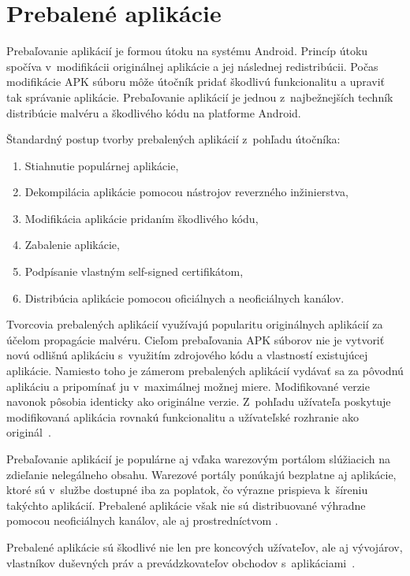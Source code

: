 \chapter{Prebalené aplikácie}
\label{chap:repackaging}
Prebaľovanie aplikácií je formou útoku na systému Android. Princíp útoku spočíva v~modifikácii originálnej aplikácie a jej následnej redistribúcii. Počas modifikácie APK súboru môže útočník pridať škodlivú funkcionalitu a upraviť tak správanie aplikácie.
Prebaľovanie aplikácií je jednou z~najbežnejších techník distribúcie malvéru a škodlivého kódu na platforme Android. 

Štandardný postup tvorby prebalených aplikácií z~pohľadu útočníka:
\begin{enumerate}
	\item Stiahnutie populárnej aplikácie,
	\item Dekompilácia aplikácie pomocou nástrojov reverzného inžinierstva,
	\item Modifikácia aplikácie pridaním škodlivého kódu,
	\item Zabalenie aplikácie,
	\item Podpísanie vlastným self-signed certifikátom,
	\item Distribúcia aplikácie pomocou oficiálnych a neoficiálnych kanálov.
\end{enumerate}

Tvorcovia prebalených aplikácií využívajú popularitu originálnych aplikácií za účelom propagácie malvéru. Cieľom prebaľovania APK súborov nie je vytvoriť novú odlišnú aplikáciu s~využitím zdrojového kódu a vlastností existujúcej aplikácie. Namiesto toho je zámerom prebalených aplikácií vydávať sa za pôvodnú aplikáciu a pripomínať ju v~maximálnej možnej miere. Modifikované verzie navonok pôsobia identicky ako originálne verzie. Z~pohľadu užívateľa poskytuje modifikovaná aplikácia rovnakú funkcionalitu a užívateľské rozhranie ako originál~\cite{Chen2015,plagScaleable}. 

Prebaľovanie aplikácií je populárne aj vďaka warezovým portálom slúžiacich na zdieľanie nelegálneho obsahu. Warezové portály ponúkajú bezplatne aj aplikácie, ktoré sú v~službe  dostupné iba za poplatok, čo výrazne prispieva k~šíreniu takýchto aplikácií. Prebalené aplikácie však nie sú distribuované výhradne pomocou neoficiálnych kanálov, ale aj prostredníctvom .

Prebalené aplikácie sú škodlivé nie len pre koncových užívateľov, ale aj vývojárov, vlastníkov duševných práv a prevádzkovateľov obchodov s~aplikáciami~\cite{CloneRelative}. 

